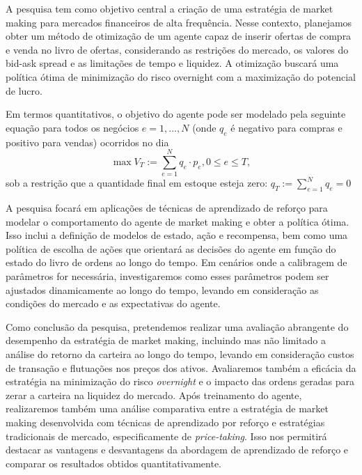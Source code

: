 A pesquisa tem como objetivo central a criação de uma estratégia de market making para mercados financeiros de alta frequência. Nesse contexto, planejamos obter um método de otimização de um agente capaz de inserir ofertas de compra e venda no livro de ofertas, considerando as restrições do mercado, os valores do bid-ask spread e as limitações de tempo e liquidez. A otimização buscará uma política ótima de minimização do risco overnight com a maximização do potencial de lucro.

Em termos quantitativos, o objetivo do agente pode ser modelado pela seguinte equação para todos os negócios $e=1,...,N$ (onde $q_e$ é negativo para compras e positivo para vendas) ocorridos no dia
\begin{equation*}
    \max V_T := \sum_{e=1}^N q_e \cdot p_e, 0 \le e \leq T, 
\end{equation*}
sob a restrição que a quantidade final em estoque esteja zero: $q_T:= \sum_{e=1}^N q_e = 0$

A pesquisa focará em aplicações de técnicas de aprendizado de reforço para modelar o comportamento do agente de market making e obter a política ótima. Isso inclui a definição de modelos de estado, ação e recompensa, bem como uma política de escolha de ações que orientará as decisões do agente em função do estado do livro de ordens ao longo do tempo. 
Em cenários onde a calibragem de parâmetros for necessária, investigaremos como esses parâmetros podem ser ajustados dinamicamente ao longo do tempo, levando em consideração as condições do mercado e as expectativas do agente.

Como conclusão da pesquisa, pretendemos realizar uma avaliação abrangente do desempenho da estratégia de market making, incluindo mas não limitado a análise do retorno da carteira ao longo do tempo, levando em consideração custos de transação e flutuações nos preços dos ativos. Avaliaremos também a eficácia da estratégia na minimização do risco \textit{overnight} e o impacto das ordens geradas para zerar a carteira na liquidez do mercado. Após treinamento do agente, realizaremos também uma análise comparativa entre a estratégia de market making desenvolvida com técnicas de aprendizado por reforço e estratégias tradicionais de mercado, especificamente de \textit{price-taking}. Isso nos permitirá destacar as vantagens e desvantagens da abordagem de aprendizado de reforço e comparar os resultados obtidos quantitativamente.
